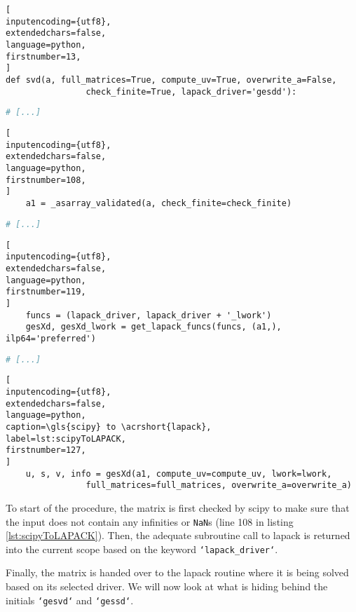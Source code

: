 \begin{lstlisting}[
inputencoding={utf8}, 
extendedchars=false, 
language=python,
firstnumber=13,
]
def svd(a, full_matrices=True, compute_uv=True, overwrite_a=False,
        		check_finite=True, lapack_driver='gesdd'):
\end{lstlisting}
%
%
%
\spacingConcatLists
\begin{lstlisting}[language=python, numbers=none]
    # [...]
\end{lstlisting}
%
%
%
\spacingConcatLists
\begin{lstlisting}[
inputencoding={utf8}, 
extendedchars=false, 
language=python,
firstnumber=108,
]
    a1 = _asarray_validated(a, check_finite=check_finite)
\end{lstlisting}
%
%
%
\spacingConcatLists
\begin{lstlisting}[language=python, numbers=none]
    # [...]
\end{lstlisting}
%
%
%
\spacingConcatLists
\begin{lstlisting}[
inputencoding={utf8}, 
extendedchars=false, 
language=python,
firstnumber=119,
]
    funcs = (lapack_driver, lapack_driver + '_lwork')
    gesXd, gesXd_lwork = get_lapack_funcs(funcs, (a1,), ilp64='preferred')
\end{lstlisting}
%
%
%
\spacingConcatLists
\begin{lstlisting}[language=python, numbers=none]
    # [...]
\end{lstlisting}
%
%
%
\spacingConcatLists
\begin{lstlisting}[
inputencoding={utf8}, 
extendedchars=false, 
language=python, 
caption=\gls{scipy} to \acrshort{lapack}, 
label=lst:scipyToLAPACK,
firstnumber=127,
]
    u, s, v, info = gesXd(a1, compute_uv=compute_uv, lwork=lwork,
                full_matrices=full_matrices, overwrite_a=overwrite_a)
\end{lstlisting}



\noindent
To start of the procedure, the matrix is first checked by \gls{scipy} to make sure that the input does not contain any infinities or \texttt{NaN}s (line 108 in listing \ref{lst:scipyToLAPACK}).
Then, the adequate subroutine call to \acrshort{lapack} is returned into the current scope based on the keyword \texttt{`lapack\_driver`}.

Finally, the matrix is handed over to the \acrshort{lapack} routine where it is being solved based on its selected driver.
We will now look at what is hiding behind the initials \texttt{`gesvd`} and \texttt{`gessd`}.
\bigskip

